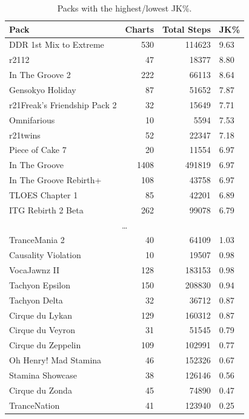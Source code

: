 \documentclass[10pt]{sigplanconf}
\begin{document}
\begin{table}[t]
	\begin{center}
		\small
	\begin{tabular}{l|r|r|l}
		\bf Pack & \bf Charts & \bf Total Steps & \bf JK\% \\
		\hline
		DDR 1st Mix to Extreme   &  530 & 114623 & 9.63 \\
		r2112                    &   47 &  18377 & 8.80 \\
		In The Groove 2          &  222 &  66113 & 8.64 \\
		Gensokyo Holiday         &   87 &  51652 & 7.87 \\
		r21Freak's Friendship Pack 2 &   32 &  15649 & 7.71 \\
		Omnifarious              &   10 &   5594 & 7.53 \\
		r21twins                 &   52 &  22347 & 7.18 \\
		Piece of Cake 7          &   20 &  11554 & 6.97 \\
		In The Groove            & 1408 & 491819 & 6.97 \\
		In The Groove Rebirth+   &  108 &  43758 & 6.97 \\
		TLOES Chapter 1          &   85 &  42201 & 6.89 \\
		ITG Rebirth 2 Beta       &  262 &  99078 & 6.79 \\
		\multicolumn{4}{c}{\normalsize\dots} \\
		TranceMania 2            &   40 &  64109 & 1.03 \\
		Causality Violation      &   10 &  19507 & 0.98 \\
		VocaJawnz II             &  128 & 183153 & 0.98 \\
		Tachyon Epsilon          &  150 & 208830 & 0.94 \\
		Tachyon Delta            &   32 &  36712 & 0.87 \\
		Cirque du Lykan          &  129 & 160312 & 0.87 \\
		Cirque du Veyron         &   31 &  51545 & 0.79 \\
		Cirque du Zeppelin       &  109 & 102991 & 0.77 \\
		Oh Henry! Mad Stamina    &   46 & 152326 & 0.67 \\
		Stamina Showcase         &   38 & 126146 & 0.56 \\
		Cirque du Zonda          &   45 &  74890 & 0.47 \\
		TranceNation             &   41 & 123940 & 0.25 \\
	\end{tabular}
	\end{center}
	\caption{Packs with the highest/lowest JK\%.}
\end{table}
\end{document}
